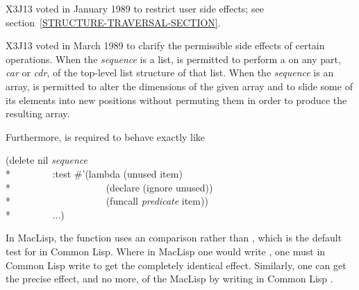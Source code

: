 \begin{defun}[Function]
\begin{new}
X3J13 voted in January 1989
to restrict user side effects; see section~\ref{STRUCTURE-TRAVERSAL-SECTION}.
\end{new}

\begin{newer}
X3J13 voted in March 1989 
to clarify the permissible side effects of certain operations.
When the \emph{sequence} is a list,
 is permitted to perform a  on any part,
\emph{car} or \emph{cdr}, of the top-level list structure of that list.
When the \emph{sequence} is an array,
 is permitted to alter the dimensions of the given array
and to slide some of its elements into new positions without permuting them
in order to produce the resulting array.

Furthermore, 
is required to behave exactly like
\begin{lisp}
(delete nil \emph{sequence} \\*
~~~~~~~~:test \#'(lambda (unused item) \\*
~~~~~~~~~~~~~~~~~~~(declare (ignore unused)) \\*
~~~~~~~~~~~~~~~~~~~(funcall \emph{predicate} item)) \\*
~~~~~~~~...)
\end{lisp}
\end{newer}

\beforenoterule
\begin{incompatibility}
In MacLisp, the  function uses
an  comparison rather than , which is the default
test for  in Common Lisp.  Where in MacLisp one would write
, one must in Common Lisp write 
to get the completely identical effect.  Similarly, one can get the
precise effect, and no more, of the MacLisp 
by writing in Common Lisp .
\end{incompatibility}
\afternoterule
\end{defun}

